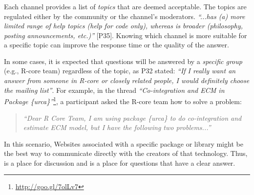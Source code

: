 \subsubsection{\reca}


    Each channel provides a list of \textit{topics} that are deemed acceptable.
    The topics are regulated either by the community or the channel's moderators. \textit{``...\SO has (a) more limited range of help topics (help for code only), whereas \RH is broader (philosophy, posting announcements, etc.)''} [P35].
    Knowing which channel is more suitable for a specific topic can improve the response time or the quality of the answer.


    In some cases, it is expected that questions will be answered by a \textit{specific group} (e.g., R-core team) regardless of the topic, as P32 stated: \textit{``If I really want an answer from someone in R-core or closely related people, I would definitely choose the mailing list''}.
    For example, in the \RH thread \textit{``Co-integration and ECM in Package \{urca\}''}\footnote{\url{http://goo.gl/7olLv7}}, a participant asked the R-core team how to solve a problem: 
     \begin{quote}
     \textit{``Dear R Core Team, I am using package \{urca\} to do co-integration and estimate ECM model, but I have the following two problems...''}
     \end{quote}
    In this scenario, Websites associated with a specific package or library might be the best way to communicate directly with the creators of that technology. Thus, \RH is a place for discussion and \SO is a place for questions that have a clear answer.

     


